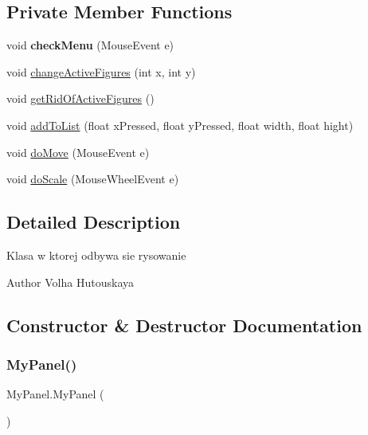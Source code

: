 \subsection*{Private Member Functions}
\begin{DoxyCompactItemize}
\item 
\mbox{\label{class_my_panel_af5f17fcefe8341ad03e7d60d38601af1}} 
void {\bfseries check\+Menu} (Mouse\+Event e)
\item 
void \hyperlink{class_my_panel_add2eb62a2206dc06b714021d160443eb}{change\+Active\+Figures} (int x, int y)
\item 
void \hyperlink{class_my_panel_a87b36d0049d583ddb1d8369a2d026af2}{get\+Rid\+Of\+Active\+Figures} ()
\item 
void \hyperlink{class_my_panel_aa5aa1bff3cdad750439efd1a6c0b7a94}{add\+To\+List} (float x\+Pressed, float y\+Pressed, float width, float hight)
\item 
void \hyperlink{class_my_panel_a9a082d14cf56b66e9899928d01b2018f}{do\+Move} (Mouse\+Event e)
\item 
void \hyperlink{class_my_panel_a557eeac694b8daa3a7da493d62434533}{do\+Scale} (Mouse\+Wheel\+Event e)
\end{DoxyCompactItemize}


\subsection{Detailed Description}
Klasa w ktorej odbywa sie rysowanie

\begin{DoxyAuthor}{Author}
Volha Hutouskaya 
\end{DoxyAuthor}


\subsection{Constructor \& Destructor Documentation}
\mbox{\label{class_my_panel_a9395d78dbd3ccb9159bcdfd8fa54bf62}} 
\subsubsection{\texorpdfstring{My\+Panel()}{MyPanel()}}
{\footnotesize\ttfamily My\+Panel.\+My\+Panel (\begin{DoxyParamCaption}{ }\end{DoxyParamCaption})\hspace{0.3cm}{\ttfamily [inline]}}

